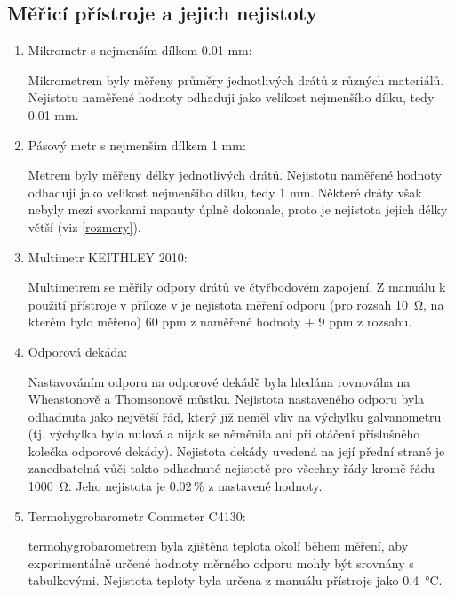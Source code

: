 \documentclass{../concepts/prepareprotokol} %
\begin{document}
\subsection{Měřicí přístroje a jejich nejistoty}
\begin{enumerate}
    \item Mikrometr s nejmenším dílkem 0.01 mm:
    
    Mikrometrem byly měřeny průměry jednotlivých drátů z různých materiálů. Nejistotu naměřené hodnoty odhaduji jako velikost nejmenšího dílku, tedy 0.01 mm.

    \item Pásový metr s nejmenším dílkem 1 mm:

    Metrem byly měřeny délky jednotlivých drátů. Nejistotu naměřené hodnoty odhaduji jako velikost nejmenšího dílku, tedy 1 mm. Některé dráty však nebyly mezi svorkami napnuty úplně dokonale, proto je nejistota jejich délky větší (viz \ref{rozmery}).

    \item Multimetr KEITHLEY 2010:

    Multimetrem se měřily odpory drátů ve čtyřbodovém zapojení. Z manuálu k použití přístroje v příloze v \cite{pokyny} je nejistota měření odporu (pro rozsah \SI{10}{\ohm}, na kterém bylo měřeno) 60 ppm z naměřené hodnoty + 9 ppm z rozsahu.

    \item Odporová dekáda:

    Nastavováním odporu na odporové dekádě byla hledána rovnováha na Wheastonově a Thomsonově můstku. Nejistota nastaveného odporu byla odhadnuta jako největší řád, který již neměl vliv na výchylku galvanometru (tj. výchylka byla nulová a nijak se něměnila ani při otáčení příslušného kolečka odporové dekády). Nejistota dekády uvedená na její přední straně je zanedbatelná vůči takto odhadnuté nejistotě pro všechny řády kromě řádu \SI{1000}{\ohm}. Jeho nejistota je 0.02\,\% z nastavené hodnoty.

    \item Termohygrobarometr Commeter C4130:

    termohygrobarometrem byla zjištěna teplota okolí během měření, aby experimentálně určené hodnoty měrného odporu mohly být srovnány s tabulkovými. Nejistota teploty byla určena z manuálu přístroje jako \SI{0.4}{\celsius}.

\end{enumerate}

\end{document}
